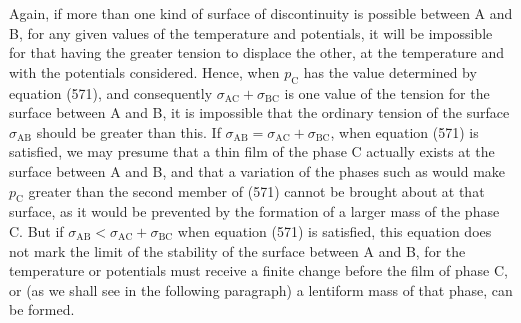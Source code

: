\documentclass[12pt]{memoir}
\begin{document}
{Again, if more than one kind of surface of discontinuity is possible between A and B, for any given values of the temperature and potentials, it will be impossible for that having the greater tension to displace the other, at the temperature and with the potentials considered. Hence, when $p_{\text{C}}$ has the value determined by equation (571), and consequently $\sigma_{\text{AC}}+ \sigma_{\text{BC}}$ is one value of the tension for the surface between A and B, it is impossible that the ordinary tension of the surface $\sigma_{\text{AB}}$ should be greater than this.  If $\sigma_{\text{AB}}=\sigma_{\text{AC}}+ \sigma_{\text{BC}}$, when equation (571) is satisfied, we may presume that a thin film of the phase C actually exists at the surface between A and B, and that a variation of the phases such as would make $p_{\text{C}}$ greater than the second member of (571) cannot be brought about at that surface, as it would be prevented by the formation of a larger mass of the phase C. But if $\sigma_{\text{AB}}<\sigma_{\text{AC}}+ \sigma_{\text{BC}}$ when equation (571) is satisfied, this equation does not mark the limit of the stability of the surface between A and B, for the temperature or potentials must receive a finite change before the film of phase C, or (as we shall see in the following paragraph) a lentiform mass of that phase, can be formed.

}
\end{document}
